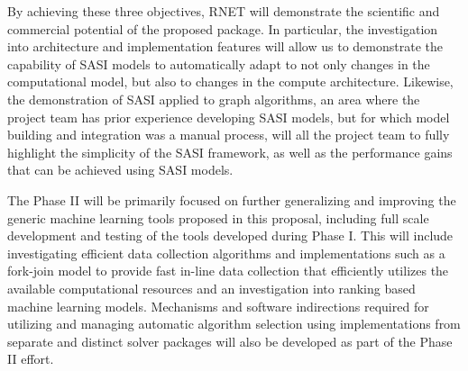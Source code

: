 By achieving these three objectives, RNET will demonstrate the scientific and commercial potential of the proposed package. In particular, the investigation into architecture and implementation features will allow us to demonstrate the capability of SASI models to automatically adapt to not only changes in the computational model, but also to changes in the compute architecture. Likewise, the demonstration of SASI applied to graph algorithms, an area where the project team has prior experience developing SASI models, but for which model building and integration was a manual process, will all the project team to fully highlight the simplicity of the SASI framework, as well as the performance gains that can be achieved using SASI models. 

The Phase II will be primarily focused on further generalizing and improving the generic machine learning tools proposed in this proposal, including full scale development and testing of the tools developed during Phase I.  This will include investigating efficient data collection algorithms and implementations such as a fork-join model to provide fast in-line data collection that efficiently utilizes the available computational resources and an investigation into ranking based machine learning models. Mechanisms and software indirections required for utilizing and managing automatic algorithm selection using implementations from separate and distinct solver packages will also be developed as part of the Phase II effort. 

